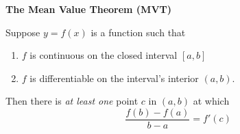 \documentclass[12pt]{report}
\begin{document}
\begin{center}
\textbf{The Mean Value Theorem (MVT)}
\end{center}

Suppose $y = f(x)$ is a function such that \\

\begin{enumerate}

\item $f$ is continuous on the closed interval $[a,b]$ \\

\item $f$ is differentiable on the interval's interior $(a,b)$.  \\

\end{enumerate}

Then there is \textit{at least one} point $c$ in $(a,b)$ at which \\

$$\frac{f(b) - f(a)}{b-a} = f'(c)$$
\end{document}
